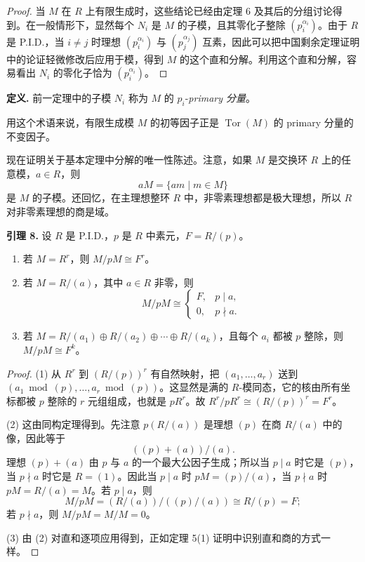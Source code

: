 \begin{proof}
当 $M$ 在 $R$ 上有限生成时，这些结论已经由定理 6 及其后的分组讨论得到。在一般情形下，显然每个 $N_i$ 是 $M$ 的子模，且其零化子整除 $(p_i^{\alpha_i})$。由于 $R$ 是 P.I.D.，当 $i\neq j$ 时理想 $(p_i^{\alpha_i})$ 与 $(p_j^{\alpha_j})$ 互素，因此可以把中国剩余定理证明中的论证轻微修改后应用于模，得到 $M$ 的这个直和分解。利用这个直和分解，容易看出 $N_i$ 的零化子恰为 $(p_i^{\alpha_i})$。
\end{proof}

\noindent\textbf{定义.} 前一定理中的子模 $N_i$ 称为 $M$ 的 $p_i$-\emph{primary 分量}。

用这个术语来说，有限生成模 $M$ 的初等因子正是 $\operatorname{Tor}(M)$ 的 primary 分量的不变因子。

现在证明关于基本定理中分解的唯一性陈述。注意，如果 $M$ 是交换环 $R$ 上的任意模，$a\in R$，则
\[
aM=\{am\mid m\in M\}
\]
是 $M$ 的子模。还回忆，在主理想整环 $R$ 中，非零素理想都是极大理想，所以 $R$ 对非零素理想的商是域。

\noindent\textbf{引理 8.} 设 $R$ 是 P.I.D.，$p$ 是 $R$ 中素元，$F=R/(p)$。
\begin{enumerate}[label=(\arabic*)]
\item 若 $M=R^r$，则 $M/pM\cong F^r$。
\item 若 $M=R/(a)$，其中 $a\in R$ 非零，则
\[
M/pM\cong
\begin{cases}
F,& p\mid a,\\
0,& p\nmid a.
\end{cases}
\]
\item 若 $M=R/(a_1)\oplus R/(a_2)\oplus\cdots\oplus R/(a_k)$，且每个 $a_i$ 都被 $p$ 整除，则 $M/pM\cong F^k$。
\end{enumerate}

\begin{proof}
(1) 从 $R^r$ 到 $(R/(p))^r$ 有自然映射，把 $(a_1,\ldots,a_r)$ 送到 $(a_1\bmod(p),\ldots,a_r\bmod(p))$。这显然是满的 $R$-模同态，它的核由所有坐标都被 $p$ 整除的 $r$ 元组组成，也就是 $pR^r$。故 $R^r/pR^r\cong(R/(p))^r=F^r$。

(2) 这由同构定理得到。先注意 $p(R/(a))$ 是理想 $(p)$ 在商 $R/(a)$ 中的像，因此等于
\[
((p)+(a))/(a).
\]
理想 $(p)+(a)$ 由 $p$ 与 $a$ 的一个最大公因子生成；所以当 $p\mid a$ 时它是 $(p)$，当 $p\nmid a$ 时它是 $R=(1)$。因此当 $p\mid a$ 时 $pM=(p)/(a)$，当 $p\nmid a$ 时 $pM=R/(a)=M$。若 $p\mid a$，则
\[
M/pM=(R/(a))/((p)/(a))\cong R/(p)=F;
\]
若 $p\nmid a$，则 $M/pM=M/M=0$。

(3) 由 (2) 对直和逐项应用得到，正如定理 5(1) 证明中识别直和商的方式一样。
\end{proof}


